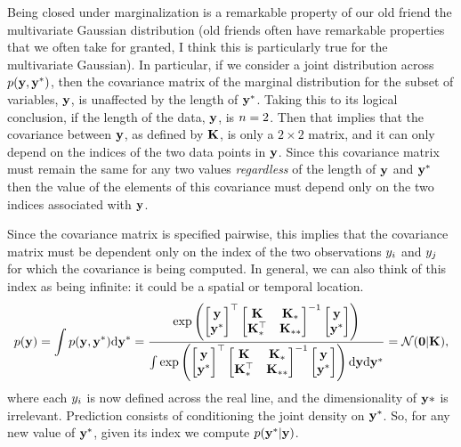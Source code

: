\documentclass[a4paperpaper,]{article}
\begin{document}
Being closed under marginalization is a remarkable property of our old
friend the multivariate Gaussian distribution (old friends often have
remarkable properties that we often take for granted, I think this is
particularly true for the multivariate Gaussian). In particular, if we
consider a joint distribution across \(p(\mathbf{ y}, \mathbf{ y}^*)\),
then the covariance matrix of the marginal distribution for the subset
of variables, \(\mathbf{ y}\), is unaffected by the length of
\(\mathbf{ y}^*\). Taking this to its logical conclusion, if the length
of the data, \(\mathbf{ y}\), is \(n=2\). Then that implies that
the covariance between \(\mathbf{ y}\), as defined by \(\mathbf{K}\),
is only a \(2\times 2\) matrix, and it can only depend on the indices of
the two data points in \(\mathbf{ y}\). Since this covariance matrix
must remain the same for any two values \emph{regardless} of the length
of \(\mathbf{ y}\) and \(\mathbf{ y}^*\) then the value of the elements
of this covariance must depend only on the two indices associated with
\(\mathbf{ y}\).

Since the covariance matrix is specified pairwise, this implies that the
covariance matrix must be dependent only on the index of the two
observations \(y_i\) and \(y_j\) for which the
covariance is being computed. In general, we can also think of this
index as being infinite: it could be a spatial or temporal location.
\begin{align*} 
p(\mathbf{ y}) = \int p(\mathbf{ y}, \mathbf{ y}^*)
\text{d}\mathbf{ y}^*=
\frac{\exp\left(\begin{bmatrix}\mathbf{ y} \\
\mathbf{ y}^*\end{bmatrix}^\top\begin{bmatrix}\mathbf{K} &
\mathbf{K}_* \\ \mathbf{K}_*^\top &
\mathbf{K}_{**}\end{bmatrix}^{-1} \begin{bmatrix}\mathbf{ y} \\
\mathbf{ y}^*\end{bmatrix}\right)}{\int
\exp\left(\begin{bmatrix}\mathbf{ y} \\
\mathbf{ y}^*\end{bmatrix}^\top\begin{bmatrix}\mathbf{K} &
\mathbf{K}_* \\ \mathbf{K}_*^\top &
\mathbf{K}_{**}\end{bmatrix}^{-1} \begin{bmatrix}\mathbf{ y} \\
\mathbf{ y}^*\end{bmatrix}\right) \text{d}\mathbf{ y}
\text{d}\mathbf{ y}^*} = \mathcal{N}(\mathbf{0} |\mathbf{K}),
\end{align*} where each \(y_i\) is now defined across the real
line, and the dimensionality of \(\mathbf{ y}*\) is irrelevant.
Prediction consists of conditioning the joint density on
\(\mathbf{ y}^*\). So, for any new value of \(\mathbf{ y}^*\), given its
index we compute \(p(\mathbf{ y}^* | \mathbf{ y})\).
\end{document}
